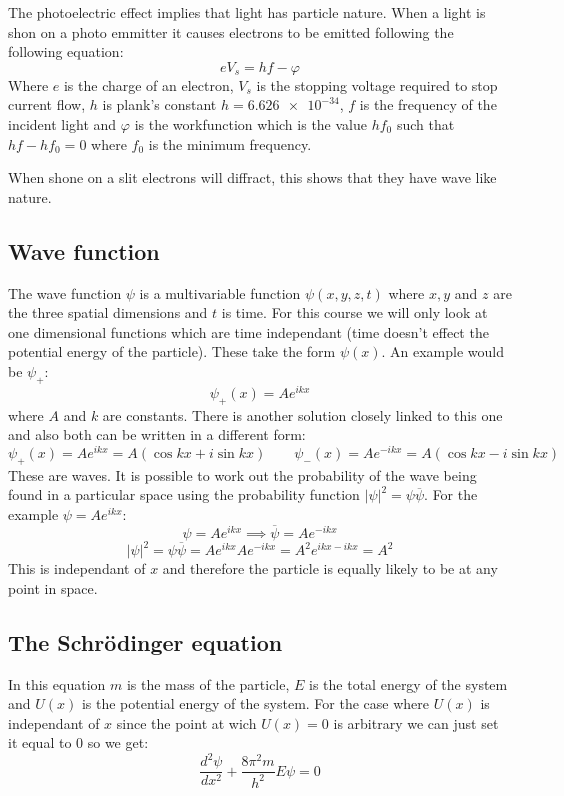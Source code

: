 \documentclass{article}
\newcommand{\dv}[3][]{\frac{d^{#1}{#2}}{d{#3}^{#1}}}
\newcommand{\cc}[1]{\overline{#1}}
\begin{document}
The photoelectric effect implies that light has particle nature. When a light is shon on a photo emmitter it causes electrons to be emitted following the following equation:
\[eV_s=hf-\varphi\]
Where \(e\) is the charge of an electron, \(V_s\) is the stopping voltage required to stop current flow, \(h\) is plank's constant \(h=\num{6.626e-34}\), \(f\) is the frequency of the incident light and \(\varphi\) is the workfunction which is the value \(hf_0\) such that \(hf-hf_0=0\) where \(f_0\) is the minimum frequency.

When shone on a slit electrons will diffract, this shows that they have wave like nature.

\subsection*{Wave function}

The wave function \(\psi\) is a multivariable function \(\psi(x,y,z,t)\) where \(x,y\) and \(z\) are the three spatial dimensions and \(t\) is time. For this course we will only look at one dimensional functions which are time independant (time doesn't effect the potential energy of the particle). These take the form \(\psi(x)\). An example would be \(\psi_+\):
\[\psi_+(x)=Ae^{ikx}\]
where \(A\) and \(k\) are constants. There is another solution closely linked to this one and also both can be written in a different form:
\[\psi_+(x)=Ae^{ikx}=A(\cos kx+i\sin kx)\qquad\psi_-(x)=Ae^{-ikx}=A(\cos kx-i\sin kx)\]
These are waves. It is possible to work out the probability of the wave being found in a particular space using the probability function \(|\psi|^2=\psi\cc\psi\). For the example \(\psi=Ae^{ikx}\):
\[\psi=Ae^{ikx}\implies\cc\psi=Ae^{-ikx}\]
\[|\psi|^2=\psi\cc\psi=Ae^{ikx}Ae^{-ikx}=A^2e^{ikx-ikx}=A^2\]
This is independant of \(x\) and therefore the particle is equally likely to be at any point in space.

\subsection*{The Schr\"odinger equation}

\begin{center}
\boxed{\dv[2]{\psi}{x}+\frac{8\pi^2m}{h^2}[E-U(x)]\psi=0}
\end{center}

In this equation \(m\) is the mass of the particle, \(E\) is the total energy of the system and \(U(x)\) is the potential energy of the system. For the case where \(U(x)\) is independant of \(x\) since the point at wich \(U(x)=0\) is arbitrary we can just set it equal to 0 so we get:
\[\dv[2]{\psi}{x}+\frac{8\pi^2m}{h^2}E\psi=0\]
\end{document}
